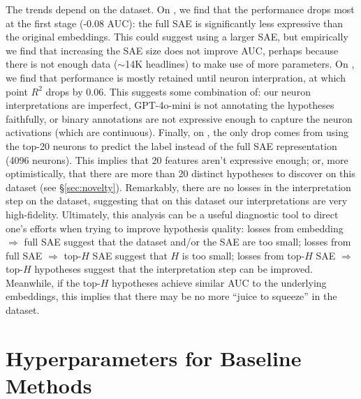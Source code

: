 The trends depend on the dataset. 
On \headlines, we find that the performance drops most at the first stage (-0.08 AUC): the full SAE is significantly less expressive than the original embeddings. This could suggest using a larger SAE, but empirically we find that increasing the SAE size does not improve AUC, perhaps because there is not enough data ($\sim$14K headlines) to make use of more parameters.
On \yelp, we find that performance is mostly retained until neuron interpration, at which point $R^2$ drops by 0.06. 
This suggests some combination of: our neuron interpretations are imperfect, GPT-4o-mini is not annotating the hypotheses faithfully, or binary annotations are not expressive enough to capture the neuron activations (which are continuous).
Finally, on \congress, the only drop comes from using the top-20 neurons to predict the label instead of the full SAE representation (4096 neurons). 
This implies that 20 features aren't expressive enough; or, more optimistically, that there are more than 20 distinct hypotheses to discover on this dataset (see \S\ref{sec:novelty}). 
Remarkably, there are no losses in the interpretation step on the \congress dataset, suggesting that on this dataset our interpretations are very high-fidelity.
Ultimately, this analysis can be a useful diagnostic tool to direct one's efforts when trying to improve hypothesis quality: losses from embedding $\Rightarrow$ full SAE suggest that the dataset and/or the SAE are too small; losses from full SAE $\Rightarrow$ top-$H$ SAE suggest that $H$ is too small; losses from top-$H$ SAE $\Rightarrow$ top-$H$ hypotheses suggest that the interpretation step can be improved.
Meanwhile, if the top-$H$ hypotheses achieve similar AUC to the underlying embeddings, this implies that there may be no more ``juice to squeeze'' in the dataset.

\section{Hyperparameters for Baseline Methods}

